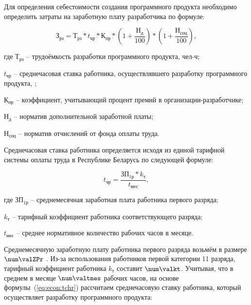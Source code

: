 Для определения себестоимости создания программного продукта необходимо определить затраты
на заработную плату разработчика по формуле:

\begin{equation}
  \label{eq:econ:Zrz}
  \text{З}_{\text{рз}} =
  \text{Т}_{\text{рз}} *
  t_{\text{чр}} *
  \text{К}_{\text{пр}} *
  \left(\text{1} + \frac{\text{Н}_{\text{д}}}{\text{100}}\right) *
  \left(\text{1} + \frac{\text{Н}_{\text{соц}}}{\text{100}}\right),
\end{equation}
\begin{explanationx}
  \item[где] $ \text{Т}_\text{рз} $ -- трудоёмкость разработки программного продукта, чел-ч;
  \item $ t_\text{чр} $ -- среднечасовая ставка работника, осуществлявшего разработку программного продукта, \rub;
  \item $ \text{К}_\text{пр} $ -- коэффициент, учитывающий процент премий
    в организации-раз\-ра\-бот\-чи\-ке;
  \item $ \text{Н}_\text{д} $ -- норматив дополнительной заработной платы;
  \item $ \text{Н}_\text{соц} $ -- норматив отчислений от фонда оплаты труда.
\end{explanationx}

Среднечасовая ставка работника определяется исходя из единой тарифной системы оплаты труда
в Республике Беларусь по следующей формуле:

\begin{equation}
  \label{eq:econ:tchr}
  t_\text{чр} = \frac{\text{ЗП}_\text{1р} * k_\text{т}}{t_\text{мес}},
\end{equation}
\begin{explanationx}
  \item[где] $ \text{ЗП}_\text{1р} $ -- среднемесячная заработная плата работника первого разряда;
  \item $ k_\text{т} $ -- тарифный коэффициент работника соответствующего разряда;
  \item $ t_\text{мес} $ -- среднее нормативное количество рабочих часов в месяце.
\end{explanationx}

Среднемесячную заработную плату работника первого разряда возьмём в размере $ \num\valZPr $ \rub.
Из-за использования работников первой категории 11 разряда, тарифный коэффициент работника
$ k_\text{т} $ составит $ \num\valkt $. Учитывая, что в среднем в месяце $ \num\valtmes $
рабочих часов, на основе формулы~(\ref{eq:econ:tchr}) рассчитаем среднечасовую ставку работника,
который осуществляет разработку программного продукта:

